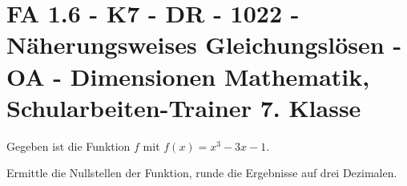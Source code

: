 \section{FA 1.6 - K7 - DR - 1022 - Näherungsweises Gleichungslösen - OA - Dimensionen Mathematik, Schularbeiten-Trainer 7. Klasse}

\begin{beispiel}[K7 - DR]{1} %
Gegeben ist die Funktion $f$ mit $f(x)=x^3-3x-1$.

Ermittle die Nullstellen der Funktion, runde die Ergebnisse auf drei Dezimalen.\leer

				
				\end{beispiel}